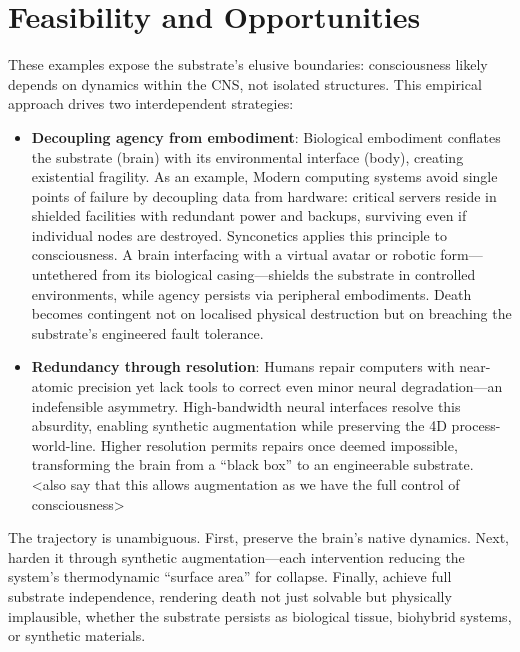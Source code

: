 \documentclass[10pt]{article}
\begin{document}
\begin{sloppypar}

  \section{Feasibility and Opportunities}
  \label{sec:feasibility}



  These examples expose the substrate’s elusive boundaries: consciousness likely depends on dynamics within the CNS, not isolated structures. This empirical approach drives two interdependent strategies:

  \begin{itemize}
    \item \textbf{Decoupling agency from embodiment}: Biological embodiment conflates the substrate (brain) with its environmental interface (body), creating existential fragility. As an example, Modern computing systems avoid single points of failure by decoupling data from hardware: critical servers reside in shielded facilities with redundant power and backups, surviving even if individual nodes are destroyed. Synconetics applies this principle to consciousness. A brain interfacing with a virtual avatar or robotic form—untethered from its biological casing—shields the substrate in controlled environments, while agency persists via peripheral embodiments. Death becomes contingent not on localised physical destruction but on breaching the substrate’s engineered fault tolerance.
    \item \textbf{Redundancy through resolution}: Humans repair computers with near-atomic precision yet lack tools to correct even minor neural degradation—an indefensible asymmetry. High-bandwidth neural interfaces resolve this absurdity, enabling synthetic augmentation while preserving the 4D process-world-line. Higher resolution permits repairs once deemed impossible, transforming the brain from a “black box” to an engineerable substrate. <also say that this allows augmentation as we have the full control of consciousness>
  \end{itemize}

  The trajectory is unambiguous. First, preserve the brain’s native dynamics. Next, harden it through synthetic augmentation—each intervention reducing the system’s thermodynamic “surface area” for collapse. Finally, achieve full substrate independence, rendering death not just solvable but physically implausible, whether the substrate persists as biological tissue, biohybrid systems, or synthetic materials.


\end{sloppypar}
\end{document}
